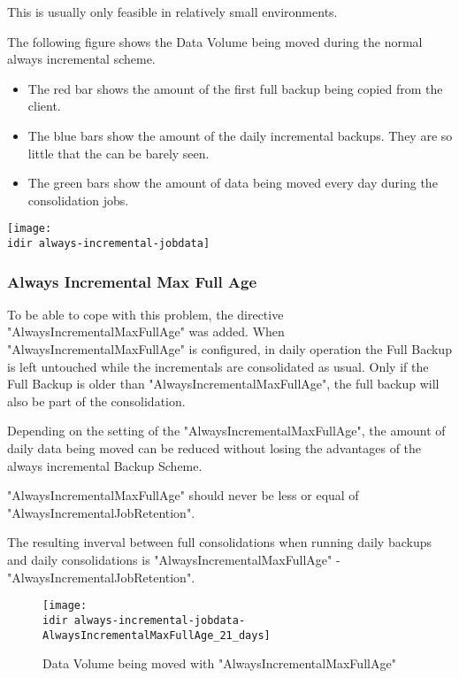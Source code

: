 This is usually only feasible in relatively small environments.

The following figure shows the Data Volume being moved during the normal always incremental scheme.
\begin{itemize}
    \item The red bar shows the amount of the first full backup being copied from the client.
    \item The blue bars show the amount of the daily incremental backups. They are so little that the can be barely seen.
    \item The green bars show the amount of data being moved every day during the consolidation jobs.
\end{itemize}

\begin{center}
\texttt{[image: \\idir always-incremental-jobdata]}
\end{center}



\subsubsection{Always Incremental Max Full Age}

To be able to cope with this problem, the directive "AlwaysIncrementalMaxFullAge" was added.
When "AlwaysIncrementalMaxFullAge" is configured, in daily operation the Full Backup is left untouched while the incrementals are consolidated as usual. 
Only if the Full Backup is older than "AlwaysIncrementalMaxFullAge", the full backup will also be part of the consolidation.

Depending on the setting of the "AlwaysIncrementalMaxFullAge", the amount of daily data being moved can be reduced without losing the advantages of the always incremental Backup Scheme.

"AlwaysIncrementalMaxFullAge" should never be less or equal of "AlwaysIncrementalJobRetention".

The resulting inverval between full consolidations when running daily backups and daily consolidations is "AlwaysIncrementalMaxFullAge" - "AlwaysIncrementalJobRetention".

\begin{figure}[htbp]
\centering
\texttt{[image: \\idir always-incremental-jobdata-AlwaysIncrementalMaxFullAge\_21\_days]}
\caption{Data Volume being moved with "AlwaysIncrementalMaxFullAge"}
\end{figure}%

